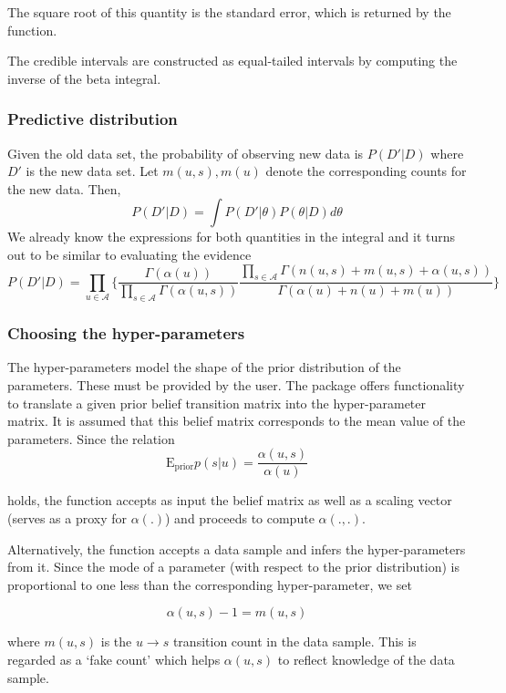\documentclass[
  nojss]{jss}
\begin{document}
The square root of this quantity is the standard error, which is returned by the function.

The credible intervals are constructed as equal-tailed intervals by computing the inverse of the beta integral.

\subsubsection{Predictive distribution}\label{predictive-distribution}

Given the old data set, the probability of observing new data is \(P(D'|D)\) where \(D'\) is the new data set. Let \(m(u, s), m(u)\) denote the corresponding counts for the new data. Then,
\[
P(D'|D) = \int P(D' | \theta) P(\theta | D) d\theta
\]
We already know the expressions for both quantities in the integral and it turns out to be similar to evaluating the evidence
\[
P(D'|D) = \prod_{u \in \mathcal{A}} \Big\{ \frac{\Gamma(\alpha(u))}{\prod_{s \in \mathcal{A}} \Gamma(\alpha(u, s))} \frac{\prod_{s \in \mathcal{A}} \Gamma(n(u, s) + m(u, s) + \alpha(u, s))}{\Gamma(\alpha(u) + n(u) + m(u))} \Big\}
\]

\subsubsection{Choosing the hyper-parameters}\label{choosing-the-hyper-parameters}

The hyper-parameters model the shape of the prior distribution of the parameters. These must be provided by the user. The package offers functionality to translate a given prior belief transition matrix into the hyper-parameter matrix. It is assumed that this belief matrix corresponds to the mean value of the parameters. Since the relation
\[
\text{E}_{\text{prior}} p(s | u) = \frac{\alpha(u, s)}{\alpha(u)}
\]

holds, the function accepts as input the belief matrix as well as a scaling vector (serves as a proxy for \(\alpha(.)\)) and proceeds to compute \(\alpha(., .)\).

Alternatively, the function accepts a data sample and infers the hyper-parameters from it. Since the mode of a parameter (with respect to the prior distribution) is proportional to one less than the corresponding hyper-parameter, we set

\[
\alpha(u, s) - 1 = m(u, s)
\]

where \(m(u, s)\) is the \(u\rightarrow s\) transition count in the data sample. This is regarded as a `fake count' which helps \(\alpha(u, s)\) to reflect knowledge of the data sample.
\end{document}
